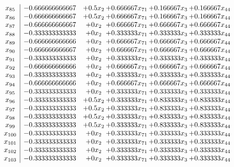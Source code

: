 \documentclass[11pt]{article}
\begin{document}
\[\begin{array}{c| c c@{\hskip 2pt} c@{\hskip 2pt} c@{\hskip 2pt} c@{\hskip 2pt} }
 x_{85}   &  -0.666666666667 & + 0.5 x_{2} & + 0.666667 x_{71} & + 0.166667 x_{3} & + 0.166667 x_{44}\\
 x_{86}   &  -0.666666666667 & + 0.5 x_{2} & + 0.666667 x_{71} & + 0.166667 x_{3} & + 0.166667 x_{44}\\
 x_{87}   &  -0.666666666667 & + 0 x_{2} & + 0.666667 x_{71} & + 0.666667 x_{3} & + 0.666667 x_{44}\\
 x_{88}   &  -0.333333333333 & + 0 x_{2} & + 0.333333 x_{71} & + 0.333333 x_{3} & + 0.333333 x_{44}\\
 x_{89}   &  -0.666666666666 & + 0 x_{2} & + 0.666667 x_{71} & + 0.666667 x_{3} & + 0.666667 x_{44}\\
 x_{90}   &  -0.666666666667 & + 0 x_{2} & + 0.666667 x_{71} & + 0.666667 x_{3} & + 0.666667 x_{44}\\
 x_{91}   &  -0.333333333333 & + 0 x_{2} & + 0.333333 x_{71} & + 0.333333 x_{3} & + 0.333333 x_{44}\\
 x_{92}   &  -0.666666666666 & + 0 x_{2} & + 0.666667 x_{71} & + 0.666667 x_{3} & + 0.666667 x_{44}\\
 x_{93}   &  -0.333333333333 & + 0 x_{2} & + 0.333333 x_{71} & + 0.333333 x_{3} & + 0.333333 x_{44}\\
 x_{94}   &  -0.666666666666 & + 0 x_{2} & + 0.666667 x_{71} & + 0.666667 x_{3} & + 0.666667 x_{44}\\
 x_{95}   &  -0.333333333333 & + 0 x_{2} & + 0.333333 x_{71} & + 0.333333 x_{3} & + 0.333333 x_{44}\\
 x_{96}   &  -0.333333333333 & + 0.5 x_{2} & + 0.333333 x_{71} & + 0.833333 x_{3} & + 0.833333 x_{44}\\
 x_{97}   &  -0.333333333333 & + 0.5 x_{2} & + 0.333333 x_{71} & + 0.833333 x_{3} & + 0.833333 x_{44}\\
 x_{98}   &  -0.333333333333 & + 0.5 x_{2} & + 0.333333 x_{71} & + 0.833333 x_{3} & + 0.833333 x_{44}\\
 x_{99}   &  -0.333333333333 & + 0.5 x_{2} & + 0.333333 x_{71} & + 0.833333 x_{3} & + 0.833333 x_{44}\\
 x_{100}   &  -0.333333333333 & + 0 x_{2} & + 0.333333 x_{71} & + 0.333333 x_{3} & + 0.333333 x_{44}\\
 x_{101}   &  -0.333333333333 & + 0 x_{2} & + 0.333333 x_{71} & + 0.333333 x_{3} & + 0.333333 x_{44}\\
 x_{102}   &  -0.333333333333 & + 0 x_{2} & + 0.333333 x_{71} & + 0.333333 x_{3} & + 0.333333 x_{44}\\
 x_{103}   &  -0.333333333333 & + 0 x_{2} & + 0.333333 x_{71} & + 0.333333 x_{3} & + 0.333333 x_{44}\\

\end{array}\]
\end{document}
